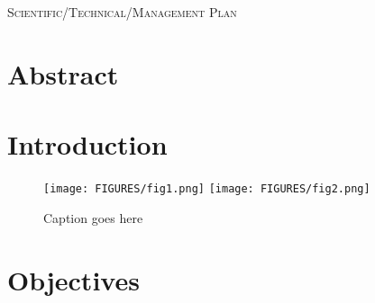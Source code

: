 \documentclass[usenames,dvipsnames,modern]{CLASS_FILES/aastex631}  %
\begin{document}

\tableofcontents
{}
\newpage

\begin{center}\color{NavyBlue}\normalfont\Large\textsc{Scientific/Technical/Management Plan}\end{center}
\vspace*{-0.5cm}


\section{Abstract}
\label{Sec:abstract}


\section{Introduction}
\label{Sec:introduction}

 \begin{figure*}[t!]
 \begin{center}
\texttt{[image: FIGURES/fig1.png]}
\texttt{[image: FIGURES/fig2.png]}
\vspace{-0.8cm}
\caption{Caption goes here}      
\label{fig:dataReductionFlowchart}
\end{center}
\end{figure*}

\section{Objectives}
\label{Sec:objectives}
\end{document}
